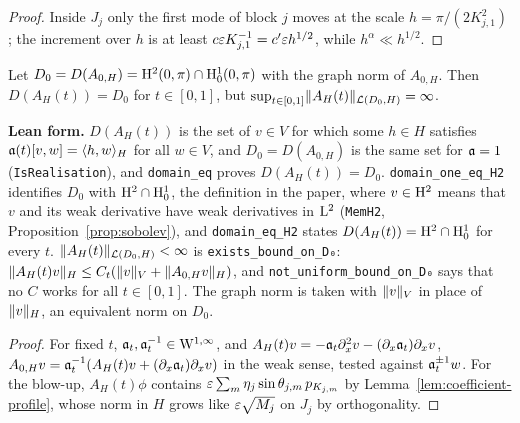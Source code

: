 \begin{proof}
  \leanok
  Inside $J_j$ only the first mode of block $j$ moves at the scale $h=\pi/(2K_{j,1}^2)$; the
  increment over $h$ is at least $c\varepsilon K_{j,1}^{-1}=c'\varepsilon h^{1/2}$, while $h^\alpha\ll h^{1/2}$.
\end{proof}

\begin{proposition}
  \label{prop:frozen-domains}
  \leanok
  Let $D_0=D(A_{0,H})=\mathrm{H}^2(0,\pi)\cap\mathrm{H}^1_0(0,\pi)$ with the graph norm of $A_{0,H}$.  Then
  $D(A_H(t))=D_0$ for $t\in[0,1]$, but $\sup_{t\in[0,1]}\lVert A_H(t)\rVert_{\mathcal{L}(D_0,H)}=\infty$.
\end{proposition}

\textbf{Lean form.}  $D(A_H(t))$ is the set of $v\in V$ for which some $h\in H$ satisfies
$\mathfrak{a}(t)[v,w]=\langle h,w\rangle_H$ for all $w\in V$, and $D_0=D(A_{0,H})$ is the same set for
$\mathfrak{a}=1$ (\texttt{IsRealisation}), and \texttt{domain\_eq} proves $D(A_H(t))=D_0$.
\texttt{domain\_one\_eq\_H2} identifies $D_0$ with $\mathrm{H}^2\cap\mathrm{H}^1_0$, the definition in the
paper, where $v\in\mathrm{H}^2$ means that $v$ and its weak derivative have weak derivatives in $\mathrm{L}^2$
(\texttt{MemH2}, Proposition~\ref{prop:sobolev}), and \texttt{domain\_eq\_H2} states
$D(A_H(t))=\mathrm{H}^2\cap\mathrm{H}^1_0$ for every $t$.
$\lVert A_H(t)\rVert_{\mathcal{L}(D_0,H)}<\infty$ is \texttt{exists\_bound\_on\_D₀}:
$\lVert A_H(t)v\rVert_H\leq C_t(\lVert v\rVert_V+\lVert A_{0,H}v\rVert_H)$, and \texttt{not\_uniform\_bound\_on\_D₀}
says that no $C$ works for all $t\in[0,1]$.  The graph norm is taken with $\lVert v\rVert_V$ in place of
$\lVert v\rVert_H$, an equivalent norm on $D_0$.

\begin{proof}
  \leanok
  For fixed $t$, $\mathfrak{a}_t,\mathfrak{a}_t^{-1}\in\mathrm{W}^{1,\infty}$, and $A_H(t)v=-\mathfrak{a}_t\partial_x^2v-(\partial_x\mathfrak{a}_t)\partial_xv$,
  $A_{0,H}v=\mathfrak{a}_t^{-1}(A_H(t)v+(\partial_x\mathfrak{a}_t)\partial_xv)$ in the weak sense, tested against
  $\mathfrak{a}_t^{\pm1}w$.  For the blow-up, $A_H(t)\phi$ contains
  $\varepsilon\sum_m\eta_j\sin\theta_{j,m}\,p_{K_{j,m}}$ by Lemma~\ref{lem:coefficient-profile}, whose
  norm in $H$ grows like $\varepsilon\sqrt{M_j}$ on $J_j$ by orthogonality.
\end{proof}
